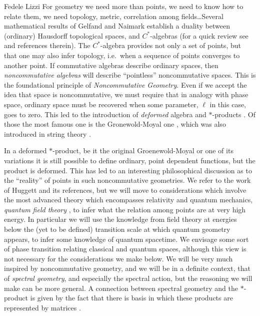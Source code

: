 \begin{artengenv}{Fedele Lizzi}
For geometry we need more than points, we need to know how to relate them, we need topology, metric, correlation among fields\ldots  Several mathematical results of Gelfand and Naimark establish a duality between (ordinary) Hausdorff topological spaces, and $C^*$-algebras (for a quick review see \cite[Chapt.~6]{WSS} and references therein). The $C^*$-algebra provides not only a set of points, but  that one may also infer topology, i.e.\ when a sequence of points converges to another point. If commutative algebras describe ordinary spaces, then \emph{noncommutative algebras} will describe ``pointless'' noncommutative spaces. This is the foundational principle of \emph{Noncommutative Geometry}. Even if we accept the idea that space is noncommutative, we must require that in analogy with phase space, ordinary space must be recovered when some parameter, $\ell$ in this case, goes to zero. This led to the introduction of \emph{deformed} algebra \parencite{Gerstenhaber} and $*$-products \parencite{starprod}. Of those the most famous one is the Gronewold-Moyal one \parencite{Gronewold,Moyal}, which was also introduced in string theory \parencite{FrohlichGawedski, LLS1, SeibergWitten}. 

In a deformed $*$-product, be it the original Groenewold-Moyal or one of its variations \parencite{GalluccioLizziVitale1, GalluccioLizziVitale2,TanasaVitale} it is still possible to define ordinary, point dependent functions, but the product is deformed. This has led to an interesting philosophical discussion as to the ``reality'' of points in such noncommutative geometries. We refer to the work of Huggett \parencite*{Huggett} and its references, but we will move to considerations which involve the most advanced theory which encompasses relativity and quantum mechanics, \emph{quantum field theory} \parencite{Weinberg}, to infer what the relation among points are at very high energy. In particular we will use the knowledge from field theory at energies below the (yet to be defined) transition scale at which quantum geometry appears, to infer some knowledge of quantum spacetime. We  envisage some sort of phase transition relating classical and quantum spaces, although this view is not necessary for the considerations we make below.
We will be very much inspired by noncommutative geometry, and we will be in a definite context, that of \emph{spectral geometry}, and especially the spectral action, but the reasoning we will make can be more general. A connection between spectral geometry and the $*$-product  is given by the fact that there is basis in which these products are represented by matrices \parencite{LizziVitaleReview}.


\end{artengenv}
